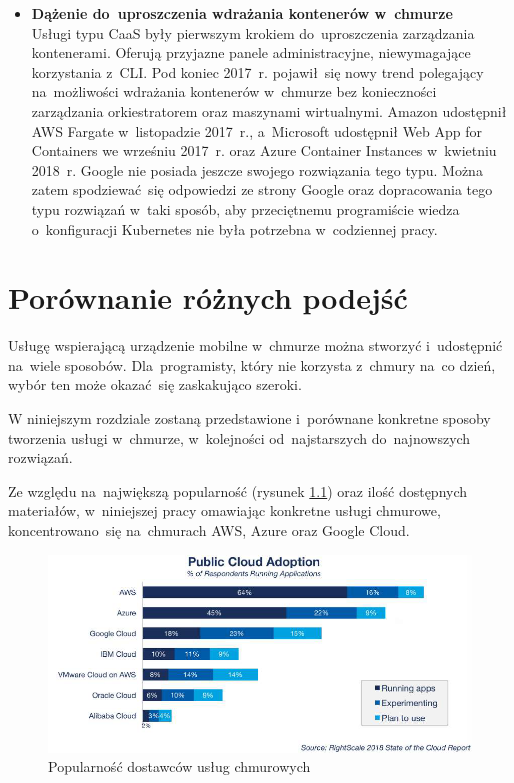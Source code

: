 \documentclass[12pt,a4paper,twoside,titlepage,openright]{book}
\begin{document}
\begin{itemize}
\item \textbf{Dążenie do~uproszczenia wdrażania kontenerów w~chmurze} \\
Usługi typu CaaS były pierwszym krokiem do~uproszczenia zarządzania kontenerami. Oferują przyjazne panele administracyjne, niewymagające korzystania z~CLI. Pod koniec 2017~r. pojawił~się nowy trend polegający na~możliwości wdrażania kontenerów w~chmurze bez konieczności zarządzania orkiestratorem oraz maszynami wirtualnymi. Amazon udostępnił AWS Fargate w~listopadzie 2017~r.,\cite{siteAwsFargateIntroducing} a~Microsoft udostępnił Web App for Containers we wrześniu 2017~r.\cite{siteAzureWebAppContainersAvailable} oraz Azure Container Instances w~kwietniu 2018~r.\cite{siteAzureContainerInstancesIntroducing} Google nie posiada jeszcze swojego rozwiązania tego typu. Można zatem spodziewać~się odpowiedzi ze strony Google oraz dopracowania tego typu rozwiązań w~taki sposób, aby przeciętnemu programiście wiedza o~konfiguracji Kubernetes nie była potrzebna w~codziennej pracy.

\end{itemize}

\chapter{Porównanie różnych podejść}

Usługę wspierającą urządzenie mobilne w~chmurze można stworzyć i~udostępnić na~wiele sposobów. Dla~programisty, który nie korzysta z~chmury na~co dzień, wybór ten może okazać~się zaskakująco szeroki.

W niniejszym rozdziale zostaną przedstawione i~porównane konkretne sposoby tworzenia usługi w~chmurze, w~kolejności od~najstarszych do~najnowszych rozwiązań.

Ze względu na~największą popularność (rysunek \ref{fig:popularnosc}) oraz ilość dostępnych materiałów, w~niniejszej pracy omawiając konkretne usługi chmurowe, koncentrowano~się na~chmurach AWS, Azure oraz Google Cloud.

\begin{figure}[h]
	\centering
			\includegraphics[width=\textwidth]{popularnosc.png}
		\caption{Popularność dostawców usług chmurowych \cite{rightscaleReport}}
		\label{fig:popularnosc}
\end{figure}
\end{document}
